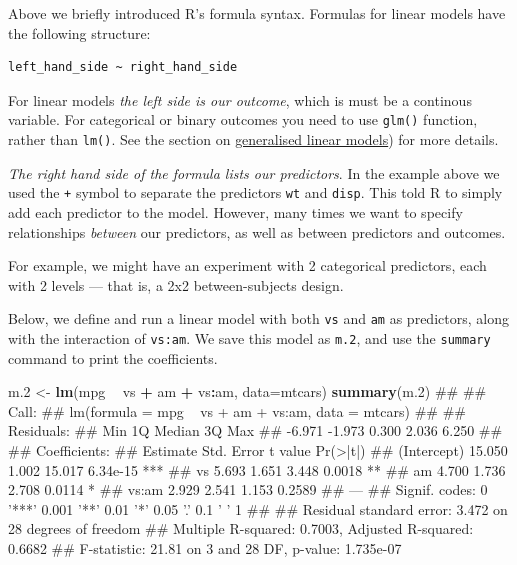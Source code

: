 \documentclass[]{article}
\newenvironment{Shaded}{\begin{snugshade}}{\end{snugshade}}
\newcommand{\KeywordTok}[1]{\textcolor[rgb]{0.13,0.29,0.53}{\textbf{#1}}}
\newcommand{\DataTypeTok}[1]{\textcolor[rgb]{0.13,0.29,0.53}{#1}}
\newcommand{\DecValTok}[1]{\textcolor[rgb]{0.00,0.00,0.81}{#1}}
\newcommand{\StringTok}[1]{\textcolor[rgb]{0.31,0.60,0.02}{#1}}
\newcommand{\OperatorTok}[1]{\textcolor[rgb]{0.81,0.36,0.00}{\textbf{#1}}}
\newcommand{\NormalTok}[1]{#1}
\theoremstyle{definition}
\theoremstyle{definition}
\theoremstyle{definition}
\theoremstyle{remark}
\begin{document}
Above we briefly introduced R's formula syntax. Formulas for linear
models have the following structure:

\begin{verbatim}
left_hand_side ~ right_hand_side
\end{verbatim}

For linear models \emph{the left side is our outcome}, which is must be
a continous variable. For categorical or binary outcomes you need to use
\texttt{glm()} function, rather than \texttt{lm()}. See the section on
\href{glm.html}{generalised linear models}) for more details.

\emph{The right hand side of the formula lists our predictors}. In the
example above we used the \texttt{+} symbol to separate the predictors
\texttt{wt} and \texttt{disp}. This told R to simply add each predictor
to the model. However, many times we want to specify relationships
\emph{between} our predictors, as well as between predictors and
outcomes.

For example, we might have an experiment with 2 categorical predictors,
each with 2 levels --- that is, a 2x2 between-subjects design.

Below, we define and run a linear model with both \texttt{vs} and
\texttt{am} as predictors, along with the interaction of \texttt{vs:am}.
We save this model as \texttt{m.2}, and use the \texttt{summary} command
to print the coefficients.

\begin{Shaded}
\begin{Highlighting}[]
\NormalTok{m.}\DecValTok{2}\NormalTok{ <-}\StringTok{ }\KeywordTok{lm}\NormalTok{(mpg }\OperatorTok{~}\StringTok{ }\NormalTok{vs }\OperatorTok{+}\StringTok{ }\NormalTok{am }\OperatorTok{+}\StringTok{ }\NormalTok{vs}\OperatorTok{:}\NormalTok{am, }\DataTypeTok{data=}\NormalTok{mtcars)}
\KeywordTok{summary}\NormalTok{(m.}\DecValTok{2}\NormalTok{)}
\NormalTok{## }
\NormalTok{## Call:}
\NormalTok{## lm(formula = mpg ~ vs + am + vs:am, data = mtcars)}
\NormalTok{## }
\NormalTok{## Residuals:}
\NormalTok{##    Min     1Q Median     3Q    Max }
\NormalTok{## -6.971 -1.973  0.300  2.036  6.250 }
\NormalTok{## }
\NormalTok{## Coefficients:}
\NormalTok{##             Estimate Std. Error t value Pr(>|t|)    }
\NormalTok{## (Intercept)   15.050      1.002  15.017 6.34e-15 ***}
\NormalTok{## vs             5.693      1.651   3.448   0.0018 ** }
\NormalTok{## am             4.700      1.736   2.708   0.0114 *  }
\NormalTok{## vs:am          2.929      2.541   1.153   0.2589    }
\NormalTok{## ---}
\NormalTok{## Signif. codes:  0 '***' 0.001 '**' 0.01 '*' 0.05 '.' 0.1 ' ' 1}
\NormalTok{## }
\NormalTok{## Residual standard error: 3.472 on 28 degrees of freedom}
\NormalTok{## Multiple R-squared:  0.7003, Adjusted R-squared:  0.6682 }
\NormalTok{## F-statistic: 21.81 on 3 and 28 DF,  p-value: 1.735e-07}
\end{Highlighting}
\end{Shaded}
\end{document}
